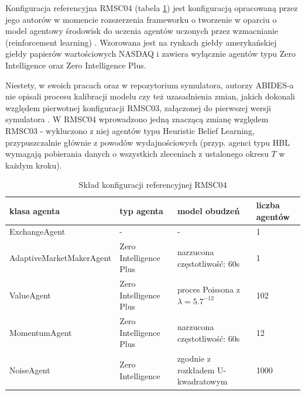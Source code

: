 Konfiguracja referencyjna RMSC04 (tabela \ref{tab:refconfig}) jest konfiguracją opracowaną przez jego autorów w momencie rozszerzenia frameworku o tworzenie w oparciu o model agentowy środowisk do uczenia agentów uczonych przez wzmacnianie (reinforcement learning) \cite{abides_gym}. Wzorowana jest na rynkach giełdy amerykańskiej giełdy papierów wartościowych NASDAQ\cite{nasdaq} i zawiera wyłącznie agentów typu Zero Intelligence oraz Zero Intelligence Plus. 

Niestety, w swoich pracach oraz w repozytorium symulatora, autorzy ABIDES-a nie opisali procesu kalibracji modelu czy też uzasadnienia zmian, jakich dokonali względem pierwotnej konfiguracji RMSC03, załączonej do pierwszej wersji symulatora \cite{getreal}. W RMSC04 wprowadzono jedną znaczącą zmianę względem RMSC03 - wykluczono z niej agentów typu Heuristic Belief Learning, przypuszczalnie głównie z powodów wydajnościowych (przyp. agenci typu HBL wymagają pobierania danych o wszystkich zleceniach z ustalonego okresu $T$ w każdym kroku). 

\begin{table}
\caption{Skład konfiguracji referencyjnej RMSC04}\label{tab:refconfig}
\begin{center}
\begin{tabular}{|p{3cm}|p{3cm}|p{4cm}|p{3cm}|}
\hline
\textbf{klasa agenta} & \textbf{typ agenta} & \textbf{model obudzeń} & \textbf{liczba agentów}\\
\hline
ExchangeAgent & - & - & 1\\
\hline
AdaptiveMarketMakerAgent & Zero Intelligence Plus & narzucona częstotliwość: 60s &1\\
\hline
ValueAgent & Zero Intelligence Plus & proces Poissona z $\lambda=5.7^{-12}$ & 102\\
\hline
MomentumAgent & Zero Intelligence Plus & narzucona częstotliwość: 60s & 12 \\
\hline
NoiseAgent & Zero Intelligence & zgodnie z rozkładem U-kwadratowym&1000\\
\hline
\end{tabular} 
\end{center}
\end{table}

